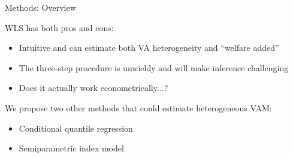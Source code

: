 \documentclass[t,aspectratio=169,11pt,presentation]{beamer}
\newenvironment{wideitemize}{\itemize\addtolength{\itemsep}{14pt}}{\enditemize}
\begin{document}
\begin{frame}[label=methods]{Methods: Overview}

\begin{wideitemize}

\item WLS has both pros and cons:
\begin{itemize}
    \item Intuitive and can estimate both VA heterogeneity and ``welfare added'' %
    \item The three-step procedure is unwieldy and will make inference challenging
    \item Does it actually work econometrically...? 
\end{itemize}

\item We propose two other methods that could estimate heterogeneous VAM:
\begin{itemize}
    \item Conditional quantile regression
    \item Semiparametric index model
\end{itemize}

\end{wideitemize}

\end{frame}
\end{document}
